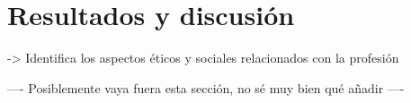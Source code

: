 
\chapter{Resultados y discusión}
\label{cha:ResultadosyDiscusion}

    -> Identifica los aspectos éticos y sociales relacionados con la profesión

    ---- Posiblemente vaya fuera esta sección, no sé muy bien qué añadir ----


\newpage
